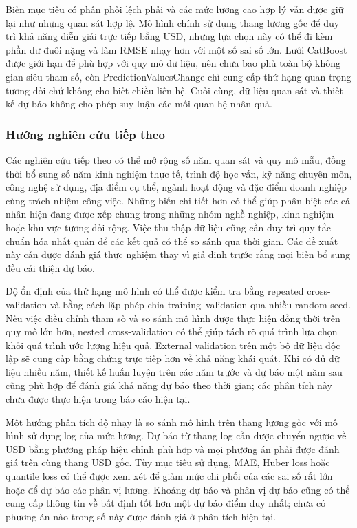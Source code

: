 Biến mục tiêu có phân phối lệch phải và các mức lương cao hợp lý vẫn
được giữ lại như những quan sát hợp lệ. Mô hình chính sử dụng thang
lương gốc để duy trì khả năng diễn giải trực tiếp bằng USD, nhưng lựa
chọn này có thể đi kèm phần dư đuôi nặng và làm RMSE nhạy hơn với một số
sai số lớn. Lưới CatBoost được giới hạn để phù hợp với quy mô dữ liệu,
nên chưa bao phủ toàn bộ không gian siêu tham số, còn
PredictionValuesChange chỉ cung cấp thứ hạng quan trọng tương đối chứ
không cho biết chiều liên hệ. Cuối cùng, dữ liệu quan sát và thiết kế dự
báo không cho phép suy luận các mối quan hệ nhân quả.

\subsubsection{Hướng nghiên cứu tiếp
theo}\label{nghi:hux1b0ux1edbng-nghiuxean-cux1ee9u-tiux1ebfp-theo}

Các nghiên cứu tiếp theo có thể mở rộng số năm quan sát và quy mô mẫu,
đồng thời bổ sung số năm kinh nghiệm thực tế, trình độ học vấn, kỹ năng
chuyên môn, công nghệ sử dụng, địa điểm cụ thể, ngành hoạt động và đặc
điểm doanh nghiệp cùng trách nhiệm công việc. Những biến chi tiết hơn có
thể giúp phân biệt các cá nhân hiện đang được xếp chung trong những nhóm
nghề nghiệp, kinh nghiệm hoặc khu vực tương đối rộng. Việc thu thập dữ
liệu cũng cần duy trì quy tắc chuẩn hóa nhất quán để các kết quả có thể
so sánh qua thời gian. Các đề xuất này cần được đánh giá thực nghiệm
thay vì giả định trước rằng mọi biến bổ sung đều cải thiện dự báo.

Độ ổn định của thứ hạng mô hình có thể được kiểm tra bằng repeated
cross-validation và bằng cách lặp phép chia training--validation qua
nhiều random seed. Nếu việc điều chỉnh tham số và so sánh mô hình được
thực hiện đồng thời trên quy mô lớn hơn, nested cross-validation có thể
giúp tách rõ quá trình lựa chọn khỏi quá trình ước lượng hiệu quả.
External validation trên một bộ dữ liệu độc lập sẽ cung cấp bằng chứng
trực tiếp hơn về khả năng khái quát. Khi có đủ dữ liệu nhiều năm, thiết
kế huấn luyện trên các năm trước và dự báo một năm sau cũng phù hợp để
đánh giá khả năng dự báo theo thời gian; các phân tích này chưa được
thực hiện trong báo cáo hiện tại.

Một hướng phân tích độ nhạy là so sánh mô hình trên thang lương gốc với
mô hình sử dụng log của mức lương. Dự báo từ thang log cần được chuyển
ngược về USD bằng phương pháp hiệu chỉnh phù hợp và mọi phương án phải
được đánh giá trên cùng thang USD gốc. Tùy mục tiêu sử dụng, MAE, Huber
loss hoặc quantile loss có thể được xem xét để giảm mức chi phối của các
sai số rất lớn hoặc để dự báo các phân vị lương. Khoảng dự báo và phân
vị dự báo cũng có thể cung cấp thông tin về bất định tốt hơn một dự báo
điểm duy nhất; chưa có phương án nào trong số này được đánh giá ở phân
tích hiện tại.

